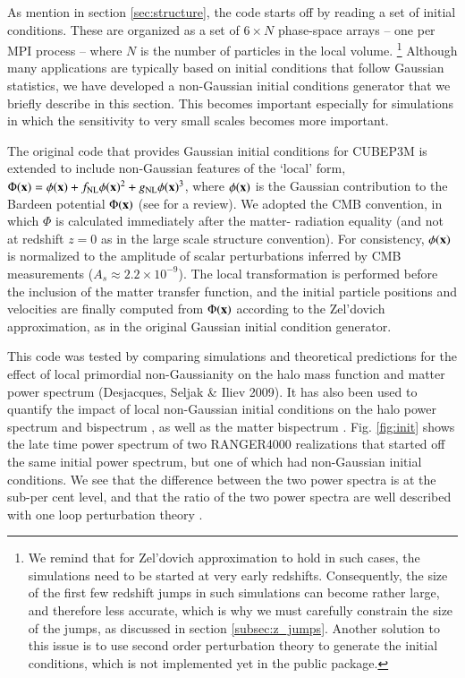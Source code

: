 \documentclass[useAMS,usenatbib]{mn2e}
\begin{document}
As mention in section \ref{sec:structure}, the code starts off by reading a set of initial conditions.
These are organized as a set of $6 \times N$ phase-space arrays -- one per {\small MPI} process -- where $N$ is the number of particles in the
local volume. \footnote{We remind that for Zel'dovich approximation to hold in such cases, the simulations need to be started at very early redshifts.
Consequently, the size of the first few redshift jumps in such simulations can become rather large, and therefore less accurate, 
which is why we must carefully constrain the size of the jumps, as discussed in section \ref{subsec:z_jumps}.
Another solution to this issue is to use second order perturbation theory to generate the initial conditions,
which is not implemented yet in the public package.}
Although many applications are typically based on initial conditions that follow Gaussian statistics,
we have developed a non-Gaussian initial conditions generator that we briefly describe in this section. 
This becomes important especially for simulations in which the sensitivity to very small scales becomes more important.

The original code that provides Gaussian initial conditions for {\small CUBEP3M} 
is extended to include non-Gaussian features of the `local' form,
$\Phi({\bf x})=\phi({\bf x})+f_{\rm NL} \phi({\bf x})^2 + g_{\rm NL} 
\phi({\bf x})^3$, where $\phi({\bf x})$ is the Gaussian contribution
to the Bardeen potential $\Phi({\bf x})$ (see \cite{2004PhR...402..103B} for a review). 
We adopted the CMB convention,
in which $\Phi$ is calculated immediately after the matter-
radiation equality (and not at redshift $z=0$ as in the large scale
structure convention). For consistency, $\phi({\bf x})$ is normalized
to the amplitude of scalar perturbations inferred by CMB measurements
($A_s\approx 2.2 \times 10^{-9}$). The local transformation is performed 
before the inclusion of the matter transfer function, and the initial 
particle positions and velocities are finally computed from $\Phi({\bf x})$ 
according to the Zel'dovich approximation, as in the original Gaussian initial condition generator.

This code was tested by comparing simulations and theoretical predictions
for the effect of local primordial non-Gaussianity on the halo mass 
function and matter power spectrum (Desjacques, Seljak \& Iliev 2009). 
It has also been used to quantify the impact of local non-Gaussian initial
conditions on the halo power spectrum \citep{2009MNRAS.396...85D,
2010PhRvD..81b3006D} and bispectrum \citep{2010MNRAS.406.1014S},
 as well as the matter bispectrum \citep{2011arXiv1111.6966S}.
Fig. \ref{fig:init} shows the late time power spectrum of two RANGER4000 realizations that started off the same initial power spectrum, 
but one of which had non-Gaussian initial conditions.
We see that the difference between the two power spectra is at the sub-per cent level, and that the ratio of the two power spectra
are well described with one loop perturbation theory \citep{2004PhRvD..69j3513S,2008PhRvD..78l3534T}.
\end{document}
